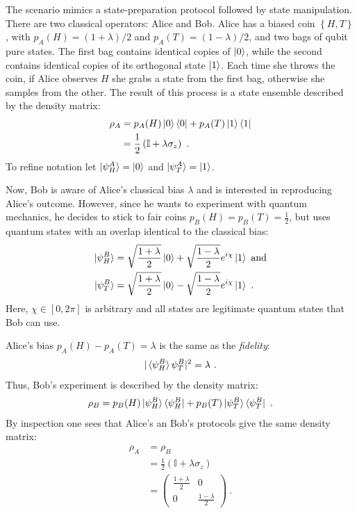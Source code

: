 \documentclass[draft,nofootinbib,prl,twocolumn,showpacs,showkeys,groupaddress,preprintnumbers,floatfix]{revtex4-1}
\newcommand{\1}{\mathbbm{1}}
\begin{document}
The scenario mimics a state-preparation protocol followed by state
manipulation. There are two classical operators: Alice and Bob. Alice has a
biased coin $\left\{ H,T\right\}$, with $p_A(H) = (1+\lambda)/2$ and $p_A(T) =
(1-\lambda)/2$, and two bags of qubit pure states. The first bag contains
identical copies of $\ket{0}$, while the second contains identical copies of
its orthogonal state $\ket{1}$. Each time she throws the coin, if Alice
observes $H$ she grabs a state from the first bag, otherwise she samples from
the other. The result of this process is a state ensemble described by the
density matrix:
\begin{align}
\rho_A & = p_A(H) \ket{0}\bra{0} + p_A(T) \ket{1}\bra{1} \nonumber \\
  & = \frac{1}{2}\left( \mathbb{I} + \lambda \sigma_z \right)
  ~.
\label{eq:rhoA} 
\end{align}
To refine notation let $\ket{\psi_H^A} = \ket{0}$ and $\ket{\psi_T^A} =
\ket{1}$.

Now, Bob is aware of Alice's classical bias $\lambda$ and is interested in 
reproducing Alice's outcome. However, since he wants to experiment with quantum
mechanics, he decides to stick to fair coins $p_B(H)=p_B(T)= \frac{1}{2}$, but
uses quantum states with an overlap identical to the classical bias:
\begin{subequations}
\begin{align}
\ket{\psi_H^B} & = \sqrt{\frac{1+\lambda}{2}} \ket{0} +
\sqrt{\frac{1-\lambda}{2}} e^{i\chi} \ket{1}~\text{and}\\
\ket{\psi_T^B} & = \sqrt{\frac{1+\lambda}{2}} \ket{0} - \sqrt{\frac{1-\lambda}{2}} e^{i\chi}\ket{1}
  ~.
\end{align}
\end{subequations}
Here, $\chi \in [0,2\pi]$ is arbitrary and all states are legitimate quantum states that Bob can use.

Alice's bias $p_A(H)-p_A(T) = \lambda$ is the same as the \emph{fidelity}:
\begin{align*}
|\braket{\psi_H^B}{\psi_T^B}|^2 = \lambda
  ~.
\end{align*}
Thus, Bob's experiment is described by the density matrix:
\begin{align*}
\rho_B = p_B(H) \ket{\psi_H^B}\bra{\psi_H^B}
  + p_B(T) \ket{\psi_T^B}\bra{\psi_T^B} 
  ~.
\end{align*}
By inspection one sees that Alice's an Bob's protocols give the same density
matrix:
\begin{align*}
\rho_A  & = \rho_B \\
  & = \frac{1}{2}\left( \mathbb{I} + \lambda \sigma_z\right) \\
  & = \left( \begin{array}{cc}
  \frac{1+\lambda}{2} & 0 \\ 0 & \frac{1-\lambda}{2}
  \end{array} \right)
~.
\end{align*}
\end{document}
